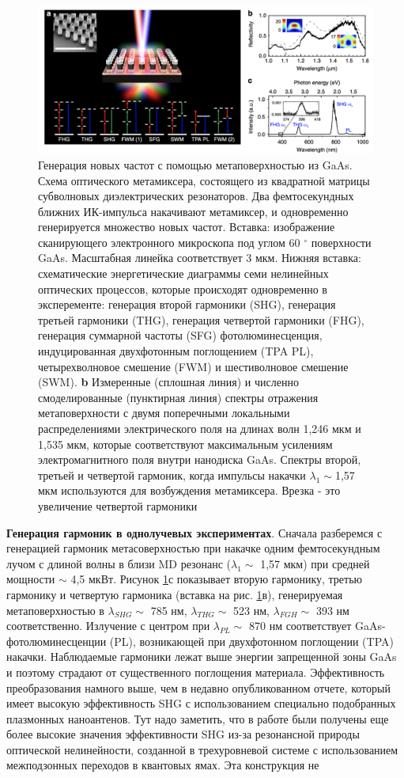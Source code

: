 \begin{figure}[h!]
	\centering
	\includegraphics[width=0.7\linewidth]{images/mixer.png}
	\caption{Генерация новых частот с помощью метаповерхностью из  GaAs. Схема оптического метамиксера, состоящего из квадратной матрицы субволновых диэлектрических резонаторов. Два фемтосекундных ближних ИК-импульса накачивают метамиксер, и одновременно генерируется множество новых частот. Вставка: изображение сканирующего электронного микроскопа под углом 60 $^\circ$ поверхности GaAs. Масштабная линейка соответствует 3 мкм. Нижняя вставка: схематические энергетические диаграммы семи нелинейных оптических процессов, которые происходят одновременно в эксперементе: генерация второй гармоники (SHG), генерация третьей гармоники (THG), генерация четвертой гармоники (FHG), генерация суммарной частоты (SFG) фотолюминесценция, индуцированная двухфотонным поглощением (TPA PL), четырехволновое смешение (FWM) и шестиволновое смешение (SWM). \textbf{b} Измеренные (сплошная линия) и численно смоделированные (пунктирная линия) спектры отражения метаповерхности с двумя поперечными локальными распределениями электрического поля на длинах волн 1,246 мкм и 1,535 мкм, которые соответствуют максимальным усилениям электромагнитного поля внутри нанодиска GaAs. Спектры второй, третьей и четвертой гармоник, когда импульсы накачки $\lambda_1 \sim $1,57 мкм используются для возбуждения метамиксера. Врезка - это увеличение четвертой гармоники}
	\label{mixerPictr1}
\end{figure}
\textbf{Генерация гармоник в однолучевых экспериментах}. Сначала разберемся с генерацией гармоник метасоверхностью при накачке одним фемтосекундным лучом с длиной волны в близи MD резонанс ($\lambda_1 \sim$ 1,57 мкм) при средней мощности $\sim$ 4,5 мкВт. Рисунок \ref{mixerPictr1}с показывает вторую гармонику, третью гармонику и четвертую гармоника (вставка на рис. \ref{mixerPictr1}в), генерируемая метаповерхностью в $\lambda_{SHG} \sim$ 785 нм, $\lambda_{THG} \sim$ 523 нм, $\lambda_{FGH} \sim$ 393 нм соответственно. Излучение с центром при $\lambda_{PL} \sim$ 870 нм соответствует GaAs-фотолюминесценции (PL), возникающей при двухфотонном поглощении (TPA) накачки. Наблюдаемые гармоники лежат выше энергии запрещенной зоны GaAs и поэтому страдают от существенного поглощения материала. Эффективность преобразования намного выше, чем в недавно опубликованном отчете, который имеет высокую эффективность SHG с использованием специально подобранных плазмонных наноантенов. Тут надо заметить, что в работе \cite{wolf2015phased} были получены еще более высокие значения эффективности SHG из-за резонансной природы оптической нелинейности, созданной в трехуровневой системе с использованием межподзонных переходов в квантовых ямах. Эта конструкция не 
